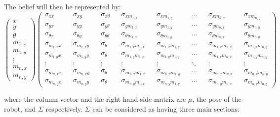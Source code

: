 \documentclass[a4paper]{article}
\begin{document}
The belief will then be represented by:
\begin{equation*}
    \begin{pmatrix}
        x \\ y \\ \theta \\ 
        m_{1,x} \\ m_{1,y} \\ \vdots \\
        m_{n,x} \\ m_{n,y}
    \end{pmatrix}
    \begin{pmatrix}
        \sigma_{xx} && \sigma_{xy} && \sigma_{x\theta} && \sigma_{xm_{1,x}} && \sigma_{xm_{1,y}} && \hdots && \sigma_{xm_{n,x}} && \sigma_{xm_{n,y}}
        \\
        \sigma_{yx} && \sigma_{yy} && \sigma_{y\theta} && \sigma_{ym_{1,x}} && \sigma_{ym_{1,y}} && \hdots && \sigma_{ym_{n,x}} && \sigma_{ym_{n,y}}
        \\
        \sigma_{\theta x} && \sigma_{\theta y} && \sigma_{\theta \theta} && \sigma_{\theta m_{1,x}} && \sigma_{\theta m_{1,y}} && \hdots && \sigma_{\theta m_{n,x}} && \sigma_{\theta m_{n,y}}
        \\
        \sigma_{m_{1,x}x} && \sigma_{m_{1,x}y} && \sigma_{\theta} && \sigma_{m_{1,x}m_{1,x}} && \sigma_{m_{1,x}m_{1,y}} && \hdots && \sigma_{m_{1,x}m_{n,x}} && \sigma_{m_{1,x}m_{n,y}}
        \\
        \sigma_{m_{1,y}x} && \sigma_{m_{1,y}y} && \sigma_{\theta} && \sigma_{m_{1,y}m_{1,x}} && \sigma_{m_{1,y}m_{1,y}} && \hdots && \sigma_{m_{1,y}m_{n,x}} && \sigma_{m_{1,y}m_{n,y}}
        \\
        \vdots && \vdots && \vdots && \vdots && \vdots && \ddots && \vdots && \vdots
        \\
        \sigma_{m_{n,x}x} && \sigma_{m_{n,x}y} && \sigma_{\theta} && \sigma_{m_{n,x}m_{1,x}} && \sigma_{m_{n,x}m_{1,y}} && \hdots && \sigma_{m_{n,x}m_{n,x}} && \sigma_{m_{n,x}m_{n,y}}
        \\
        \sigma_{m_{n,y}x} && \sigma_{m_{n,y}y} && \sigma_{\theta} && \sigma_{m_{n,y}m_{1,x}} && \sigma_{m_{n,y}m_{1,y}} && \hdots && \sigma_{m_{n,y}m_{n,x}} && \sigma_{m_{n,y}m_{n,y}}
    \end{pmatrix}
\end{equation*}

where the column vector and the right-hand-side matrix are $\mu$, the pose of the robot, and $\Sigma$ respectively. $\Sigma$ can be considered as having three main sections:
\end{document}
